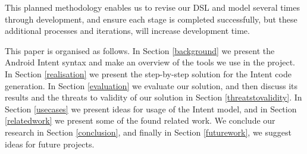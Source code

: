 This planned methodology enables us to revise our DSL and model several times through development, and ensure each stage is completed successfully, but these additional processes and iterations, will increase development time.

This paper is organised as follows. In Section \ref{background} we present the Android Intent syntax and make an overview of the tools we use in the project. In Section \ref{realisation} we present the step-by-step solution for the Intent code generation. In Section \ref{evaluation} we evaluate our solution, and then discuss its results and the threats to validity of our solution in Section \ref{threatstovalidity}. In Section \ref{usecases} we present ideas for usage of the Intent model, and in Section \ref{relatedwork} we present some of the found related work. We conclude our research in Section \ref{conclusion}, and finally in Section \ref{futurework}, we suggest ideas for future projects.